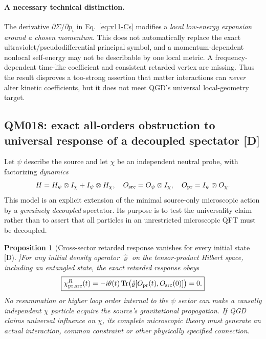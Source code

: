 \documentclass[11pt,a4paper]{article}
\newtheorem{proposition}{Proposition}[section]\newtheorem{lemma}[proposition]{Lemma}\newtheorem{definition}[proposition]{Definition}\newtheorem{remark}[proposition]{Remark}
\begin{document}
\paragraph{A necessary technical distinction.} The derivative $\partial\Sigma/\partial p_i$ in Eq.~\eqref{eq:v11-Cs} modifies a \emph{local low-energy expansion around a chosen momentum}. This does not automatically replace the exact ultraviolet/pseudodifferential principal symbol, and a momentum-dependent nonlocal self-energy may not be describable by one local metric. A frequency-dependent time-like coefficient and consistent retarded vertex are missing. Thus the result disproves a too-strong assertion that matter interactions can \emph{never} alter kinetic coefficients, but it does not meet QGD's universal local-geometry target.

\subsection{QM018: exact all-orders obstruction to universal response of a decoupled spectator [D]}\label{sec:v11-factorization}
Let $\psi$ describe the source and let $\chi$ be an independent neutral probe, with factorizing \emph{dynamics}
\begin{equation}\label{eq:v11-factorHam}
 H=H_\psi\otimes I_\chi+I_\psi\otimes H_\chi,
 \quad O_{\rm src}=O_\psi\otimes I_\chi,\quad
 O_{\rm pr}=I_\psi\otimes O_\chi.
\end{equation}
This model is an explicit extension of the minimal source-only microscopic action by a \emph{genuinely decoupled} spectator. Its purpose is to test the universality claim rather than to assert that all particles in an unrestricted microscopic QFT must be decoupled.
\begin{proposition}[Cross-sector retarded response vanishes for every initial state [D]]\label{prop:v11-noCross}
For any initial density operator $\hat\varrho$ on the tensor-product Hilbert space, \emph{including an entangled state}, the exact retarded response obeys
\begin{equation}\label{eq:v11-Kubo}
\boxed{\chi^R_{{\rm pr},{\rm src}}(t)
 =-i\theta(t)\operatorname{Tr}\bigl(\hat\varrho
 [O_{\rm pr}(t),O_{\rm src}(0)]\bigr)=0.}
\end{equation}
No resummation or higher loop order internal to the $\psi$ sector can make a causally independent $\chi$ particle acquire the source's gravitational propagation. If QGD claims universal influence on $\chi$, its complete microscopic theory must generate an actual interaction, common constraint or other physically specified connection.
\end{proposition}
\end{document}
